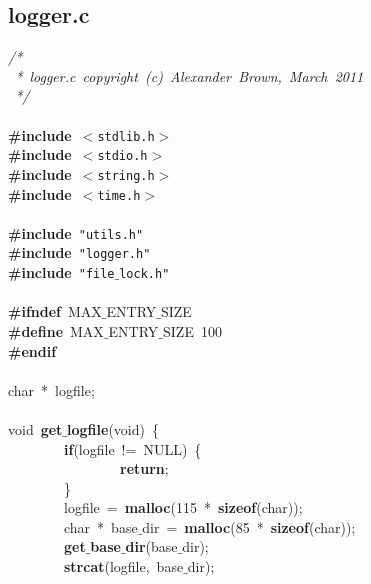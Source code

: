 \subsection{logger.c}
\scriptsize
\sffamily
\noindent
\mbox{}\textit{/*} \\
\mbox{}\textit{\ *\ logger.c\ copyright\ (c)\ Alexander\ Brown,\ March\ 2011} \\
\mbox{}\textit{\ */} \\
\mbox{} \\
\mbox{}\textbf{\#include}\ \texttt{$<$stdlib.h$>$} \\
\mbox{}\textbf{\#include}\ \texttt{$<$stdio.h$>$} \\
\mbox{}\textbf{\#include}\ \texttt{$<$string.h$>$} \\
\mbox{}\textbf{\#include}\ \texttt{$<$time.h$>$} \\
\mbox{} \\
\mbox{}\textbf{\#include}\ \texttt{"{}utils.h"{}} \\
\mbox{}\textbf{\#include}\ \texttt{"{}logger.h"{}} \\
\mbox{}\textbf{\#include}\ \texttt{"{}file$\_$lock.h"{}} \\
\mbox{} \\
\mbox{}\textbf{\#ifndef}\ MAX$\_$ENTRY$\_$SIZE \\
\mbox{}\textbf{\#define}\ MAX$\_$ENTRY$\_$SIZE\ 100 \\
\mbox{}\textbf{\#endif} \\
\mbox{} \\
\mbox{}char\ *\ logfile; \\
\mbox{} \\
\mbox{}void\ \textbf{get$\_$logfile}(void)\ \{ \\
\mbox{}\ \ \ \ \ \ \ \ \textbf{if}(logfile\ !=\ NULL)\ \{ \\
\mbox{}\ \ \ \ \ \ \ \ \ \ \ \ \ \ \ \ \textbf{return}; \\
\mbox{}\ \ \ \ \ \ \ \ \} \\
\mbox{}\ \ \ \ \ \ \ \ logfile\ =\ \textbf{malloc}(115\ *\ \textbf{sizeof}(char)); \\
\mbox{}\ \ \ \ \ \ \ \ char\ *\ base$\_$dir\ =\ \textbf{malloc}(85\ *\ \textbf{sizeof}(char)); \\
\mbox{}\ \ \ \ \ \ \ \ \textbf{get$\_$base$\_$dir}(base$\_$dir); \\
\mbox{}\ \ \ \ \ \ \ \ \textbf{strcat}(logfile,\ base$\_$dir); \\
